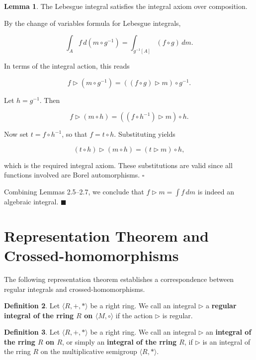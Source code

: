 \documentclass[12pt]{article}
\theoremstyle{definition}
\newtheorem{definition}{Definition}[section]
\newtheorem{lemma}[definition]{Lemma}
\begin{document}
\vspace{10pt}
\begin{lemma}  The Lebesgue integral satisfies the integral axiom over composition.

\vspace{5pt}
By the change of variables formula for Lebesgue integrals,  

\[
\int_A f \, d(m \circ g^{-1}) = \int_{g^{-1}[A]} (f \circ g) \, dm.
\]

In terms of the integral action, this reads  

\[
f \triangleright (m \circ g^{-1}) = ((f \circ g) \triangleright m) \circ g^{-1}.
\]

Let $h = g^{-1}$. Then  

\[
f \triangleright (m \circ h) = ((f \circ h^{-1}) \triangleright m) \circ h.
\]

Now set $t = f \circ h^{-1}$, so that $f = t \circ h$. Substituting yields  

\[
(t \circ h) \triangleright (m \circ h) = (t \triangleright m) \circ h,
\]

which is the required integral axiom. These substitutions are valid since all functions involved are Borel automorphisms.  $\square$
\end{lemma}
\vspace{5pt}

Combining Lemmas 2.5–2.7, we conclude that $f \triangleright m = \int f \, dm$ is indeed an algebraic integral. $\blacksquare$

\newpage
\section{Representation Theorem and Crossed-homomorphisms}

The following representation theorem establishes a correspondence between regular integrals and crossed-homomorphisms.

\vspace{10pt}

\begin{definition} Let $\langle R, +, * \rangle$ be a right ring. We call an integral $\triangleright$ a \textbf{regular integral of the rring $R$ on $\langle M, \circ \rangle$} if the action $\triangleright$ is regular.
\end{definition}

\vspace{10pt}

\begin{definition} Let $\langle R, +, * \rangle$ be a right ring. We call an integral $\triangleright$ an \textbf{integral of the rring $R$ on $R$}, or simply an \textbf{integral of the rring $R$}, if $\triangleright$ is an integral of the rring $R$ on the multiplicative semigroup $\langle R, * \rangle$. 
\end{definition}
\end{document}
